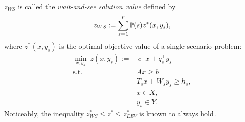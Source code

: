 $z_{WS}$ is called the \textit{wait-and-see solution value} defined by
\begin{align} \label{ws}
	z_{WS}:=\sum_{s=1}^r \operatorname*{\mathbb{P}}(s)z^*(x,y_s),
\end{align}
where $z^*(x,y_s)$ is the optimal objective value of a single scenario problem: 
\begin{subequations}
	\begin{align}
	\min_{x,y_s}\ z(x,y_s):=&\ c^\top x+q_s^\top y_s \label{ssp:obj}\\
	\mathrm{s.t.}\ &Ax \ge b \label{ssp:b}\\
	&T_s x + W_s y_s\ge h_s,  \label{ssp:c}\\
	&x\in X,  \label{ssp:d}\\
	&y_s \in Y. \label{ssp:e}
	\end{align}
\end{subequations}
Noticeably, the inequality $z^*_{WS}\le z^*\le z^*_{EEV}$ is known to always hold.

